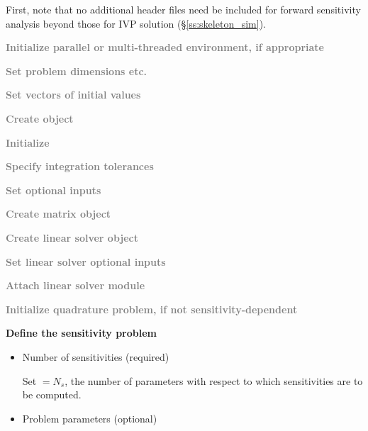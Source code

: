 First, note that no additional header files need be included for
forward sensitivity analysis beyond those for IVP solution
(\S\ref{ss:skeleton_sim}).
 \begin{Steps}
  
\item 
  \textcolor{gray}{\bf Initialize parallel or multi-threaded environment,
  if appropriate}

\item
  \textcolor{gray}{\bf Set problem dimensions etc.}

\item
  \textcolor{gray}{\bf Set vectors of initial values}
 
\item
  \textcolor{gray}{\bf Create {\idas} object}

\item
  \textcolor{gray}{\bf Initialize {\idas}}

\item
  \textcolor{gray}{\bf Specify integration tolerances}

\item
  \textcolor{gray}{\bf Set optional inputs}

\item
  \textcolor{gray}{\bf Create matrix object}

\item
  \textcolor{gray}{\bf Create linear solver object}

\item
  \textcolor{gray}{\bf Set linear solver optional inputs}

\item
  \textcolor{gray}{\bf Attach linear solver module}

\item
  \textcolor{gray}{\bf Initialize quadrature problem, if not sensitivity-dependent}

\item \label{i:fwd_start}
  {\bf Define the sensitivity problem}

  \begin{itemize}

    \item Number of sensitivities (required)

      Set  $= N_s$, the number of parameters with respect to which sensitivities
      are to be computed.
  
    \item Problem parameters (optional)


\end{itemize}
\end{Steps}
